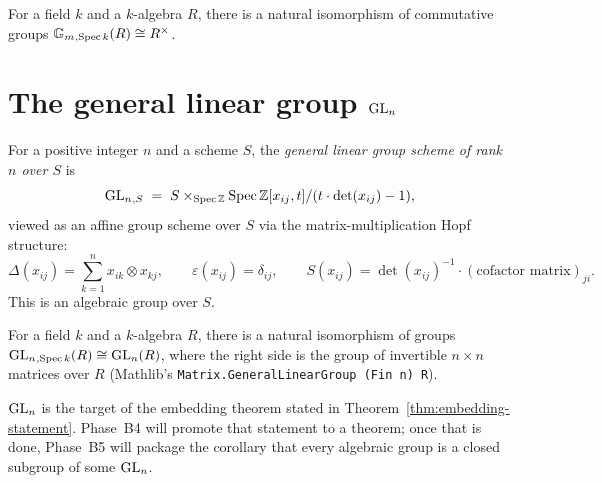 \begin{lemma}[$\Gm(R) = R^\times$]\label{lem:Gm-points}
For a field $k$ and a $k$-algebra $R$, there is a natural isomorphism of
commutative groups $\mathbb{G}_m{}_{,\operatorname{Spec} k}(R) \cong R^\times$.
\end{lemma}

\section{The general linear group $\mathrm{GL}_n$}

\begin{definition}\label{def:GLn}
For a positive integer $n$ and a scheme $S$, the \emph{general linear group
scheme of rank~$n$ over $S$} is
\[
  \mathrm{GL}_n{}_{,S} \;=\; S \times_{\operatorname{Spec} \mathbb{Z}} \operatorname{Spec} \mathbb{Z}[x_{ij}, t]/(t \cdot \det(x_{ij}) - 1),
\]
viewed as an affine group scheme over $S$ via the matrix-multiplication Hopf
structure:
\[
  \Delta(x_{ij}) = \sum_{k=1}^n x_{ik} \otimes x_{kj}, \qquad
  \varepsilon(x_{ij}) = \delta_{ij}, \qquad
  S(x_{ij}) = \det(x_{ij})^{-1} \cdot (\text{cofactor matrix})_{ji}.
\]
This is an algebraic group over $S$.
\end{definition}

\begin{lemma}[$\GL_n(R) = \mathrm{GL}_n(R)$ as abstract group]\label{lem:GLn-points}
For a field $k$ and a $k$-algebra $R$, there is a natural isomorphism of
groups $\mathrm{GL}_n{}_{,\operatorname{Spec} k}(R) \cong \mathrm{GL}_n(R)$, where the right side
is the group of invertible $n \times n$ matrices over $R$
(Mathlib's \texttt{Matrix.GeneralLinearGroup (Fin n) R}).
\end{lemma}

\begin{remark}\label{rem:GLn-as-embedding-target}
$\mathrm{GL}_n$ is the target of the embedding theorem stated in
Theorem~\ref{thm:embedding-statement}. Phase~B4 will promote that
statement to a theorem; once that is done, Phase~B5 will package the
corollary that every algebraic group is a closed subgroup of some
$\mathrm{GL}_n$.
\end{remark}
